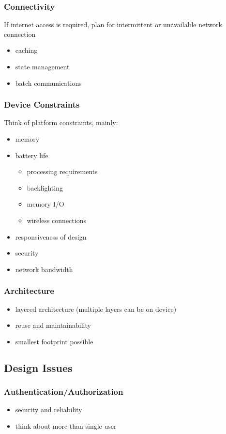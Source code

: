 \documentclass[]{article}
\theoremstyle{definition}
\begin{document}
	\subsubsection{Connectivity}
	If internet access is required, plan for intermittent or unavailable network connection
	\begin{itemize}
		\item caching
		\item state management
		\item batch communications
	\end{itemize}

	\subsubsection{Device Constraints}
	Think of platform constraints, mainly:
	\begin{itemize}
		\item memory
		\item battery life
			\begin{itemize}
				\item processing requirements
				\item backlighting
				\item memory I/O
				\item wireless connections
			\end{itemize}
		\item responsiveness of design
		\item security
		\item network bandwidth
	\end{itemize}

	\subsubsection{Architecture}
	\begin{itemize}
		\item layered architecture (multiple layers can be on device)
		\item reuse and maintainability
		\item smallest footprint possible
	\end{itemize}

	\subsection{Design Issues}
	\subsubsection{Authentication/Authorization}
	\begin{itemize}
		\item security and reliability
		\item think about more than single user
	\end{itemize}
\end{document}
